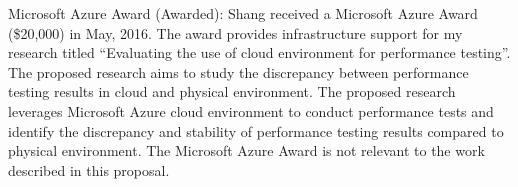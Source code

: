 \documentclass[12pt, letterpaper]{article}
\begin{document}
Microsoft Azure Award (Awarded): Shang received a Microsoft Azure Award (\$20,000) in May, 2016. The award provides infrastructure support for my research titled ``Evaluating the use of cloud environment for performance testing''. The proposed research aims to study the discrepancy between performance testing results in cloud and physical environment. The proposed research leverages Microsoft Azure cloud environment to conduct performance tests and identify the discrepancy and stability of performance testing results compared to physical environment. The Microsoft Azure Award is not relevant to the work described in this proposal.
\end{document}
